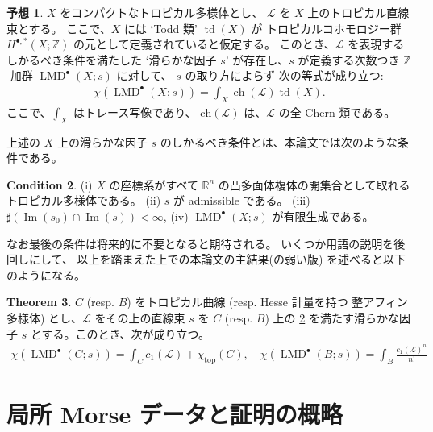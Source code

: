 \documentclass[a4paper,dvipdfmx,reqno,12pt]{amsart}
\theoremstyle{definition}
\newtheorem{theorem}{Theorem}[section]
\newtheorem{conjecture}[theorem]{予想}
\newtheorem{condition}[theorem]{Condition}
\newcommand{\opn}[1]{\operatorname{#1}}
\numberwithin{equation}{section}
\begin{document}
\begin{conjecture}

$X$ をコンパクトなトロピカル多様体とし、
$\mathcal{L}$ を $X$ 上のトロピカル直線束とする。
ここで、$X$ には `Todd 類' $\opn{td}(X)$ が
トロピカルコホモロジー群 $H^{\bullet,*}(X;\mathbb{Z})$
の元として定義されていると仮定する。
このとき、$\mathcal{L}$ を表現するしかるべき条件を満たした
`滑らかな因子 $s$' が存在し、$s$ が定義する次数つき
$\mathbb{Z}$-加群 $\opn{LMD}^{\bullet}(X;s)$ に対して、
$s$ の取り方によらず
次の等式が成り立つ:
\begin{align}
\chi(\opn{LMD}^{\bullet}(X;s))=\int_{X}\opn{ch}(\mathcal{L})\opn{td}(X).
\end{align}
ここで、$\int_X$ はトレース写像であり、
$\mathrm{ch}(\mathcal{L})$ は、$\mathcal{L}$ の全 Chern 類である。
\end{conjecture}

上述の $X$ 上の滑らかな因子 $s$ のしかるべき条件とは、本論文では次のような条件である。

\begin{condition} \label{condition-good}
(i) $X$ の座標系がすべて $\mathbb{R}^{n}$ 
の凸多面体複体の開集合として取れるトロピカル多様体である。
(ii) $s$ が admissible である。
(iii) $\sharp (\opn{Im}(s_0)\cap \opn{Im}(s))<\infty$, 
(iv) $\opn{LMD}^{\bullet}(X;s)$ が有限生成である。
\end{condition}
なお最後の条件は将来的に不要となると期待される。
いくつか用語の説明を後回しにして、
以上を踏まえた上での本論文の主結果(の弱い版)
を述べると以下のようになる。

\begin{theorem}
$C$ (resp. $B$) をトロピカル曲線 (resp. Hesse 計量を持つ
整アフィン多様体) とし、$\mathcal{L}$ をその上の直線束
$s$ を $C$ (resp. $B$) 上の
\cref{condition-good} を満たす滑らかな因子 $s$ 
とする。このとき、次が成り立つ。
\begin{align}
\chi(\opn{LMD}^{\bullet}(C;s))=\int_C c_1(\mathcal{L})+
\chi_{\opn{top}}(C), \quad
\chi(\opn{LMD}^{\bullet}(B;s))=\int_B \frac{c_1(\mathcal{L})^n}{n!}
\end{align}
 \end{theorem}

\section{局所 Morse データと証明の概略}



\end{document}
